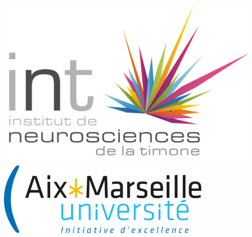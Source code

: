 \documentclass[a0,portrait]{a0poster}
\begin{document}


\begin{minipage}[b]{0.75\linewidth}
\Huge \color{Navy} \textbf{\Title} \color{Black}\\ %
\huge \textbf{\Author} \\[0.5cm] %
\huge \Address\\[0.4cm] %
\Large \texttt{\Email} \\
\end{minipage}
%
\begin{minipage}[b]{0.25\linewidth}
\includegraphics[width=13cm]{Logo_int.png}\ 
\includegraphics[width=10.5cm]{Logo_amu.png}\\
\end{minipage}
\end{document}
